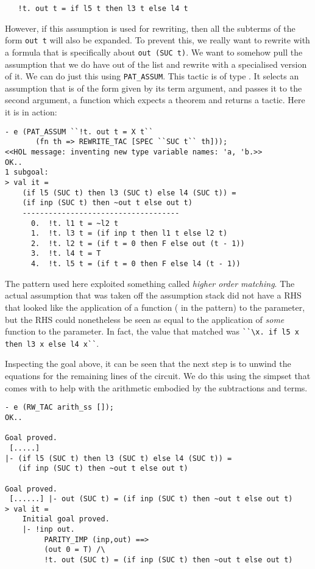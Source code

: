 {\small\begin{verbatim}
   !t. out t = if l5 t then l3 t else l4 t
\end{verbatim}}

    However, if this assumption is used for rewriting, then all the
    subterms of the form {\small\verb|out t|} will also be expanded.
    To prevent this, we really want to rewrite with a formula that is
    specifically about {\small\verb|out (SUC t)|}.  We want to somehow
    pull the assumption that we do have out of the list and rewrite
    with a specialised version of it.  We can do just this using
    {\small\verb|PAT_ASSUM|}.  This tactic is of type .  It selects an assumption that is of the form given
    by its term argument, and passes it to the second argument, a
    function which expects a theorem and returns a tactic.  Here it is
    in action:

\begin{session}
\begin{verbatim}
- e (PAT_ASSUM ``!t. out t = X t``
       (fn th => REWRITE_TAC [SPEC ``SUC t`` th]));
<<HOL message: inventing new type variable names: 'a, 'b.>>
OK..
1 subgoal:
> val it =
    (if l5 (SUC t) then l3 (SUC t) else l4 (SUC t)) =
    (if inp (SUC t) then ~out t else out t)
    ------------------------------------
      0.  !t. l1 t = ~l2 t
      1.  !t. l3 t = (if inp t then l1 t else l2 t)
      2.  !t. l2 t = (if t = 0 then F else out (t - 1))
      3.  !t. l4 t = T
      4.  !t. l5 t = (if t = 0 then F else l4 (t - 1))
\end{verbatim}
\end{session}
The pattern used here exploited something called \emph{higher order
  matching}. The actual assumption that was taken off the assumption
stack did not have a RHS that looked like the application of a
function ( in the pattern) to the  parameter, but the RHS
could nonetheless be seen as equal to the application of \emph{some}
function to the  parameter.  In fact, the value that matched
 was {\small\verb|``\x. if l5 x then l3 x else l4 x``|}.

Inspecting the goal above, it can be seen that the next step is to
unwind the equations for the remaining lines of the circuit.  We do
this using the  simpset that comes with  to
help with the arithmetic embodied by the subtractions and 
terms.

\begin{session}
\begin{verbatim}
- e (RW_TAC arith_ss []);
OK..

Goal proved.
 [.....]
|- (if l5 (SUC t) then l3 (SUC t) else l4 (SUC t)) =
   (if inp (SUC t) then ~out t else out t)

Goal proved.
 [......] |- out (SUC t) = (if inp (SUC t) then ~out t else out t)
> val it =
    Initial goal proved.
    |- !inp out.
         PARITY_IMP (inp,out) ==>
         (out 0 = T) /\
         !t. out (SUC t) = (if inp (SUC t) then ~out t else out t)
\end{verbatim}
\end{session}

